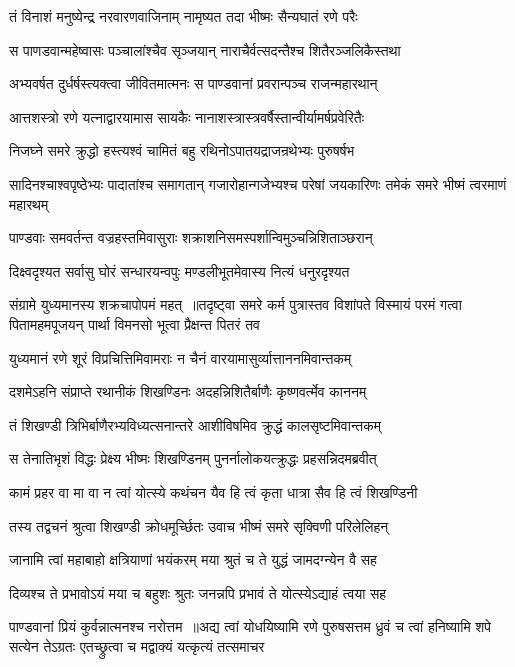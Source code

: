 \twolineshloka
{तं विनाशं मनुष्येन्द्र नरवारणवाजिनाम्}
{नामृष्यत तदा भीष्मः सैन्यघातं रणे परैः}


\twolineshloka
{स पाणडवान्महेष्वासः पञ्चालांश्चैव सृञ्जयान्}
{नाराचैर्वत्सदन्तैश्च शितैरञ्जलिकैस्तथा}


\twolineshloka
{अभ्यवर्षत दुर्धर्षस्त्यक्त्वा जीवितमात्मनः}
{स पाण्डवानां प्रवरान्पञ्च राजन्महारथान्}


\twolineshloka
{आत्तशस्त्रो रणे यत्नाद्वारयामास सायकैः}
{नानाशस्त्रास्त्रवर्षैस्तान्वीर्यामर्षप्रवेरितैः}


\twolineshloka
{निजघ्ने समरे क्रुद्धो हस्त्यश्वं चामितं बहु}
{रथिनोऽपातयद्राजन्रथेभ्यः पुरुषर्षभ}


सादिनश्चाश्वपृष्ठेभ्यः पादातांश्च समागतान्
\twolineshloka
{गजारोहान्गजेभ्यश्च परेषां जयकारिणः}
{तमेकं समरे भीष्मं त्वरमाणं महारथम्}


\twolineshloka
{पाण्डवाः समवर्तन्त वज्रहस्तमिवासुराः}
{शक्राशनिसमस्पर्शान्विमुञ्चन्निशिताञ्छरान्}


\twolineshloka
{दिक्ष्वदृश्यत सर्वासु घोरं सन्धारयन्वपुः}
{मण्डलीभूतमेवास्य नित्यं धनुरदृश्यत}


संग्रामे युध्यमानस्य शक्रचापोपमं महत् ॥तदृष्ट्वा समरे कर्म पुत्रास्तव विशांपते
\twolineshloka
{विस्मायं परमं गत्वा पितामहमपूजयन्}
{पार्था विमनसो भूत्वा प्रैक्षन्त पितरं तव}


\twolineshloka
{युध्यमानं रणे शूरं विप्रचित्तिमिवामराः}
{न चैनं वारयामासुर्व्यात्ताननमिवान्तकम्}


\twolineshloka
{दशमेऽहनि संप्राप्ते रथानीकं शिखण्डिनः}
{अदहन्निशितैर्बाणैः कृष्णवर्त्मेव काननम्}


\twolineshloka
{तं शिखण्डी त्रिभिर्बाणैरभ्यविध्यत्सनान्तरे}
{आशीविषमिव क्रुद्धं कालसृष्टमिवान्तकम्}


\twolineshloka
{स तेनातिभृशं विद्धः प्रेक्ष्य भीष्मः शिखण्डिनम्}
{पुनर्नालोकयत्क्रुद्धः प्रहसन्निदमब्रवीत्}


\twolineshloka
{कामं प्रहर वा मा वा न त्वां योत्स्ये कथंचन}
{यैव हि त्वं कृता धात्रा सैव हि त्वं शिखण्डिनी}


\twolineshloka
{तस्य तद्वचनं श्रुत्वा शिखण्डी क्रोधमूर्च्छितः}
{उवाच भीष्मं समरे सृक्विणी परिलेलिहन्}


\twolineshloka
{जानामि त्वां महाबाहो क्षत्रियाणां भयंकरम्}
{मया श्रुतं च ते युद्धं जामदग्न्येन वै सह}


\twolineshloka
{दिव्यश्च ते प्रभावोऽयं मया च बहुशः श्रुतः}
{जनन्नपि प्रभावं ते योत्स्येऽद्याहं त्वया सह}


पाण्डवानां प्रियं कुर्वन्नात्मनश्च नरोत्तम ॥अद्य त्वां योधयिष्यामि रणे पुरुषसत्तम
\twolineshloka
{ध्रुवं च त्वां हनिष्यामि शपे सत्येन तेऽग्रतः}
{एतच्छ्रुत्वा च मद्वाक्यं यत्कृत्यं तत्समाचर}


